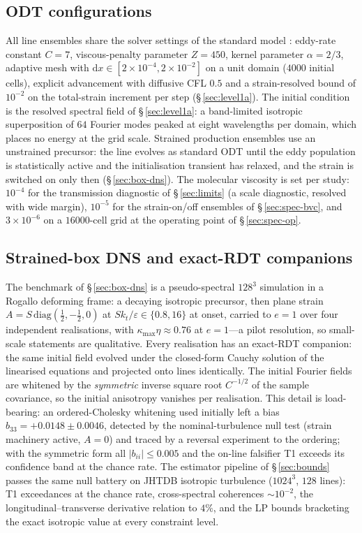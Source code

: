 \documentclass[lineno]{JFM-FLM_Au}
\begin{document}
\subsection{ODT configurations}

All line ensembles share the solver settings of the standard model
\citep{StephensLignell2021}: eddy-rate constant $C=7$, viscous-penalty
parameter $Z=450$, kernel parameter $\alpha=2/3$, adaptive mesh with
$\mathrm{d}x\in[2\times10^{-4},2\times10^{-2}]$ on a unit domain
($4000$ initial cells), explicit advancement with diffusive CFL $0.5$
and a strain-resolved bound of $10^{-2}$ on the total-strain increment
per step (\S\,\ref{sec:level1a}). The initial condition is the resolved
spectral field of \S\,\ref{sec:level1a}: a band-limited isotropic
superposition of $64$ Fourier modes peaked at eight wavelengths per
domain, which places no energy at the grid scale. Strained production
ensembles use an unstrained precursor: the line evolves as standard ODT
until the eddy population is statistically active and the initialisation
transient has relaxed, and the strain is switched on only then
(\S\,\ref{sec:box-dns}). The molecular viscosity is set per study:
$10^{-4}$ for the transmission diagnostic of \S\,\ref{sec:limits}
(a scale diagnostic, resolved with wide margin), $10^{-5}$ for the
strain-on/off ensembles of \S\,\ref{sec:spec-bvc}, and
$3\times10^{-6}$ on a $16000$-cell grid at the operating point of
\S\,\ref{sec:spec-op}.

\subsection{Strained-box DNS and exact-RDT companions}

The benchmark of \S\,\ref{sec:box-dns} is a pseudo-spectral $128^3$
simulation in a Rogallo deforming frame: a decaying isotropic precursor,
then plane strain $A=S\,\mathrm{diag}(\tfrac12,-\tfrac12,0)$ at
$Sk_t/\varepsilon\in\{0.8,16\}$ at onset, carried to $e=1$ over four
independent realisations, with $\kappa_{\max}\eta\approx0.76$ at
$e=1$---a pilot resolution, so small-scale statements are qualitative.
Every realisation has an exact-RDT companion: the same initial field
evolved under the closed-form Cauchy solution of the linearised
equations and projected onto lines identically. The initial Fourier
fields are whitened by the \emph{symmetric} inverse square root
$C^{-1/2}$ of the sample covariance, so the initial anisotropy vanishes
per realisation. This detail is load-bearing: an ordered-Cholesky
whitening used initially left a bias $b_{33}=+0.0148\pm0.0046$,
detected by the nominal-turbulence null test (strain machinery active,
$A=0$) and traced by a reversal experiment to the ordering; with the
symmetric form all $|b_{ii}|\le0.005$ and the on-line falsifier T1
exceeds its confidence band at the chance rate. The estimator pipeline
of \S\,\ref{sec:bounds} passes the same null battery on JHTDB isotropic
turbulence ($1024^3$, $128$ lines): T1 exceedances at the chance rate,
cross-spectral coherences $\sim10^{-2}$, the longitudinal--transverse
derivative relation to $4\%$, and the LP bounds bracketing the exact
isotropic value at every constraint level.
\end{document}
